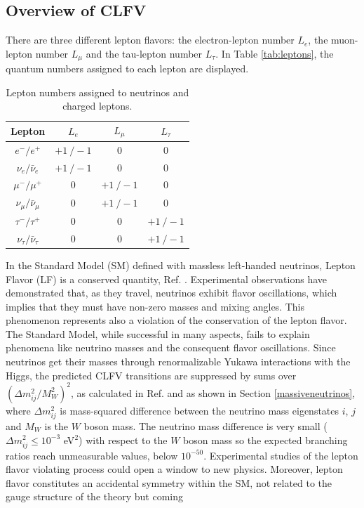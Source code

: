 \subsection{Overview of CLFV}
There are three different lepton flavors: the electron-lepton number $L_e$, the muon-lepton number $L_{\mu}$ and the tau-lepton number $L_{\tau}$. In Table \ref{tab:leptons}, the quantum numbers assigned to each lepton are displayed.
 \begin{center}  
\begin{table}[!h]
\centering
\renewcommand{\arraystretch}{1.5}
\begin{tabular}{c c c c}
\hline
Lepton & $L_e$ & $L_{\mu}$ & $L_{\tau}$\\
\hline
$e^-/e^+$ & $+1 \ /-1$ & 0 & 0 \\
$\nu_{e}/\bar{\nu}_{e}$ & $+1 \ /-1$ & 0 & 0 \\
$\mu^-/\mu^+$ & 0 & $+1 \ /-1$ & 0 \\
$\nu_{\mu}/\bar{\nu}_{\mu}$ & 0 & $+1 \ /-1$ & 0 \\
$\tau^-/\tau^+$ & 0 & 0 & $+1 \ /-1$\\
$\nu_{\tau}/\bar{\nu}_{\tau}$ & 0 & 0 & $+1 \ /-1$ \\
\hline
\end{tabular}
\caption{Lepton numbers assigned to neutrinos and charged leptons.}
\end{table}\label{tab:leptons}
\end{center}
In the Standard Model (SM) defined with massless left-handed neutrinos, Lepton Flavor (LF) is a conserved quantity, Ref. \cite{universe8060299}. Experimental observations have demonstrated that, as they travel, neutrinos exhibit flavor oscillations, which implies that they must have non-zero masses and mixing angles. This phenomenon represents also a violation of the conservation of the lepton flavor. The Standard Model, while successful in many aspects, fails to explain phenomena like neutrino masses and the consequent flavor oscillations. Since neutrinos get their masses through renormalizable Yukawa interactions
with the Higgs, the predicted CLFV transitions are suppressed by sums over $(\Delta m^2_{i j}/M^2 _W)^2$, as calculated in Ref. \cite{MARCIANO1977303} and as shown in Section \ref{massiveneutrinos}, where $\Delta m^2_{ij}$ is mass-squared difference between the neutrino mass eigenstates $i$, $j$ and $M_W$ is the $W$ boson mass. The neutrino mass difference is very small ($\Delta m^2 _{i j} \leq 10^{-3}$ eV$^2$) with respect to the $W$ boson mass so the expected branching ratios reach unmeasurable values, below $10^{-50}$. Experimental studies of the lepton flavor violating process could open a window to new physics. Moreover, lepton flavor constitutes an accidental symmetry within the SM, not related to the gauge structure of the theory but coming
